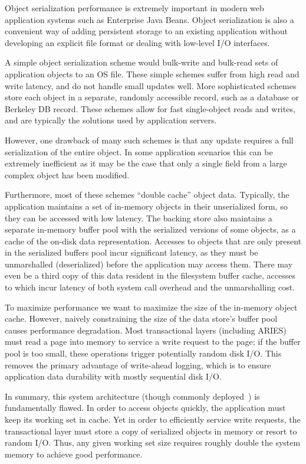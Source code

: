\documentclass[10pt,letterpaper,twocolumn,english]{article}
\begin{document}
Object serialization performance is extremely important in modern web
application systems such as Enterprise Java Beans.  Object
serialization is also a convenient way of adding persistent storage to
an existing application without developing an explicit file format or
dealing with low-level I/O interfaces.

A simple object serialization scheme would bulk-write and bulk-read
sets of application objects to an OS file.  These simple
schemes suffer from high read and write latency, and do not handle
small updates well.  More sophisticated schemes store each object in a
separate, randomly accessible record, such as a database  or
 Berkeley DB record.  These schemes allow for fast single-object reads and writes, and are typically the solutions used by
application servers.

However, one drawback of many such schemes is that any update requires
a full serialization of the entire object. In some application
scenarios this can be extremely inefficient as it may be the case
that only a single field from a large complex object has been
modified.

Furthermore, most of these schemes ``double cache'' object
data.  Typically, the application maintains a set of in-memory
objects in their unserialized form, so they can be accessed with low latency.
The backing store also
maintains a separate in-memory buffer pool with the serialized versions of
some objects, as a cache of the on-disk data representation.
Accesses to objects that are only present in the serialized buffers
pool incur significant latency, as they must be unmarshalled (deserialized)
before the application may access them.  
There may even be a third copy of this data resident in the filesystem 
buffer cache, accesses to which incur latency of both system call overhead and
the unmarshalling cost.

To maximize performance we want to maximize the size of the in-memory object cache.
However, naively constraining the size of the data store's buffer pool
causes performance degradation. Most transactional layers 
(including ARIES) must read a page
into memory to service a write request to the page; if the buffer pool
is too small, these operations trigger potentially random disk I/O. 
This removes the primary
advantage of write-ahead logging, which is to ensure application data
durability with mostly sequential disk I/O.

In summary, this system architecture (though commonly
deployed~\cite{ejb,ordbms,jdo,...}) is fundamentally
flawed.  In order to access objects quickly, the application must keep
its working set in cache.  Yet in order to efficiently service write 
requests, the
transactional layer must store a copy of serialized objects
in memory or resort to random I/O.  
Thus, any given working set size requires roughly double the system
memory to achieve good performance.
\end{document}
